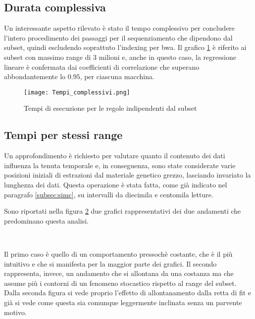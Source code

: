 \subsection{Durata complessiva}
Un interessante aspetto rilevato è stato il tempo complessivo per concludere l'intero procedimento dei passaggi per il sequenziamento che dipendono dal subset, quindi escludendo soprattuto l'indexing per bwa.
Il grafico \ref{fig:Ttot} è riferito ai subset con massimo range di 3 milioni e, anche in questo caso, la regressione lineare è confermata dai coefficienti di correlazione che superano abbondantemente lo $0.95$, per ciascuna macchina.
\begin{figure}[H]
\centering
\texttt{[image: Tempi\_complessivi.png]}
\caption{Tempi di esecuzione per le regole indipendenti dal subset}
\label{fig:Ttot}
\end{figure}

\subsection{Tempi per stessi range}
Un approfondimento è richiesto per valutare quanto il contenuto dei dati influenza la tenuta temporale e, in conseguenza, sono state considerate varie posizioni iniziali di estrazioni dal materiale genetico grezzo, lasciando invariato la lunghezza dei dati.
Questa operazione è stata fatta, come già indicato nel paragrafo \ref{subsec:simc}, su intervalli da diecimila e centomila letture.

Sono riportati nella figura \ref{fig:Trng} due grafici rappresentativi dei due andamenti che predominano questa analisi.
\begin{figure}[H]
\centering
{} \quad
{} \\
\caption{}
\label{fig:Trng}
\end{figure}

Il primo caso è quello di un comportamento pressochè costante, che è il più intuitivo e che si manifesta per la maggior parte dei grafici.
Il secondo rappresenta, invece, un andamento che si allontana da una costanza ma che assume più i contorni di un fenomeno stocastico rispetto al range del subset.
Dalla seconda figura si vede proprio l'effetto di allontanamento dalla retta di fit e già si vede come questa sia comunque leggermente inclinata senza un parvente motivo.

